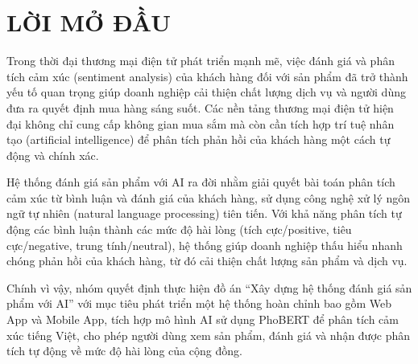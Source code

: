 
\newpage



\section{\textbf{LỜI MỞ ĐẦU}}
Trong thời đại thương mại điện tử phát triển mạnh mẽ, việc đánh giá và phân tích cảm xúc (sentiment analysis) của khách hàng đối với sản phẩm đã trở thành yếu tố quan trọng giúp doanh nghiệp cải thiện chất lượng dịch vụ và người dùng đưa ra quyết định mua hàng sáng suốt. Các nền tảng thương mại điện tử hiện đại không chỉ cung cấp không gian mua sắm mà còn cần tích hợp trí tuệ nhân tạo (artificial intelligence) để phân tích phản hồi của khách hàng một cách tự động và chính xác.

Hệ thống đánh giá sản phẩm với AI ra đời nhằm giải quyết bài toán phân tích cảm xúc từ bình luận và đánh giá của khách hàng, sử dụng công nghệ xử lý ngôn ngữ tự nhiên (natural language processing) tiên tiến. Với khả năng phân tích tự động các bình luận thành các mức độ hài lòng (tích cực/positive, tiêu cực/negative, trung tính/neutral), hệ thống giúp doanh nghiệp thấu hiểu nhanh chóng phản hồi của khách hàng, từ đó cải thiện chất lượng sản phẩm và dịch vụ.

Chính vì vậy, nhóm quyết định thực hiện đồ án “Xây dựng hệ thống đánh giá sản phẩm với AI” với mục tiêu phát triển một hệ thống hoàn chỉnh bao gồm Web App và Mobile App, tích hợp mô hình AI sử dụng PhoBERT để phân tích cảm xúc tiếng Việt, cho phép người dùng xem sản phẩm, đánh giá và nhận được phân tích tự động về mức độ hài lòng của cộng đồng.
